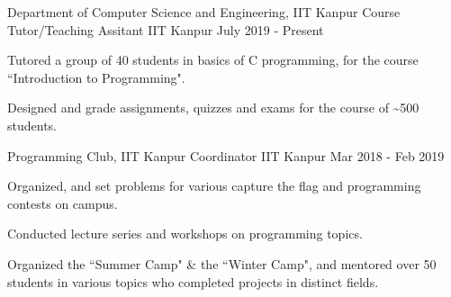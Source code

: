 

\begin{cventries}

  \extraentry
  {Department of Computer Science and Engineering, IIT Kanpur}
  {Course Tutor/Teaching Assitant}
  {IIT Kanpur}
  {July 2019 - Present}
  {
    \begin{cvitems}
      \item Tutored a group of 40 students in basics of C programming, for the course ``Introduction to Programming".
      \item Designed and grade assignments, quizzes and exams for the course of \textasciitilde500 students.
    \end{cvitems}
  }

  \extraentry
  {Programming Club, IIT Kanpur}
  {Coordinator}
  {IIT Kanpur}
  {Mar 2018 - Feb 2019}
  {
    \begin{cvitems}
      \item Organized, and set problems for various capture the flag and programming contests on campus.
      \item Conducted lecture series and workshops on programming topics.
      \item Organized the ``Summer Camp" \& the ``Winter Camp", and mentored over 50 students in various topics who completed projects in distinct fields.
    \end{cvitems}
  }
  \vspace{-0.3cm}

\end{cventries}
